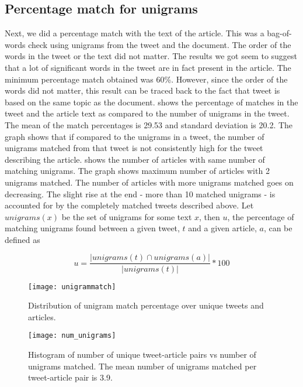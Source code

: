 \subsection{Percentage match for unigrams}

Next, we did a percentage match with the text of the article. This was a bag-of-words check using unigrams from the tweet and the document. The order of the words in the tweet or the text did not matter. The results we got seem to suggest that a lot of significant words in the tweet are in fact present in the article. The minimum percentage match obtained was 60\%. However, since the order of the words did not matter, this result can  be traced back to the fact that tweet is based on the same topic as the document.  shows the percentage of matches in the tweet and the article text as compared to the number of unigrams in the tweet. The mean of the match percentages is 29.53 and standard deviation is 20.2. The graph shows that if compared to the unigrams in a tweet, the number of unigrams matched from that tweet is not consistently high for the tweet describing the article.  shows the number of articles with same number of matching unigrams. The graph shows maximum number of articles with 2 unigrams matched. The number of articles with more unigrams matched goes on decreasing. The slight rise at the end - more than 10 matched unigrams - is accounted for by the completely matched tweets described above. Let $\textit{unigrams}(x)$ be the set of unigrams for some text $x$, then $u$, the percentage of matching unigrams found between a given tweet, $t$ and a given article, $a$, can be defined as  

\begin{equation}
u = \frac{| unigrams(t) \cap unigrams(a) |}{| unigrams(t) |} * 100
\end{equation}

\begin{figure}[htbp]
\centering
\texttt{[image: unigrammatch]}
\caption{Distribution of unigram match percentage over unique tweets and articles.}
\label{fig:unigrammatch}
\end{figure}

\begin{figure}[htbp]
\centering
\texttt{[image: num\_unigrams]}
\caption{Histogram of number of unique tweet-article pairs vs number of unigrams matched. The mean number of unigrams matched per tweet-article pair is 3.9.}
\label{fig:num_unigrams}
\end{figure}

